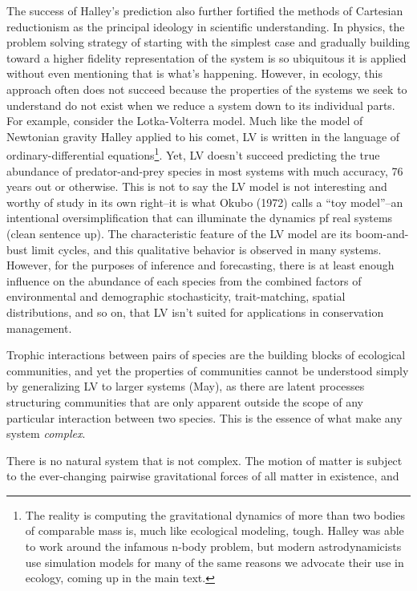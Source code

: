 The success of Halley's prediction also further fortified the methods of
Cartesian reductionism as the principal ideology in scientific
understanding. In physics, the problem solving strategy of starting with
the simplest case and gradually building toward a higher fidelity
representation of the system is so ubiquitous it is applied without even
mentioning that is what's happening. However, in ecology, this approach
often does not succeed because the properties of the systems we seek to
understand do not exist when we reduce a system down to its individual
parts. For example, consider the Lotka-Volterra model. Much like the
model of Newtonian gravity Halley applied to his comet, LV is written in
the language of ordinary-differential equations\footnote{The reality is
  computing the gravitational dynamics of more than two bodies of
  comparable mass is, much like ecological modeling, tough. Halley was
  able to work around the infamous n-body problem, but modern
  astrodynamicists use simulation models for many of the same reasons we
  advocate their use in ecology, coming up in the main text.}. Yet, LV
doesn't succeed predicting the true abundance of predator-and-prey
species in most systems with much accuracy, 76 years out or otherwise.
This is not to say the LV model is not interesting and worthy of study
in its own right--it is what Okubo (1972) calls a ``toy model''--an
intentional oversimplification that can illuminate the dynamics pf real
systems (clean sentence up). The characteristic feature of the LV model
are its boom-and-bust limit cycles, and this qualitative behavior is
observed in many systems. However, for the purposes of inference and
forecasting, there is at least enough influence on the abundance of each
species from the combined factors of environmental and demographic
stochasticity, trait-matching, spatial distributions, and so on, that LV
isn't suited for applications in conservation management.

Trophic interactions between pairs of species are the building blocks of
ecological communities, and yet the properties of communities cannot be
understood simply by generalizing LV to larger systems (May), as there
are latent processes structuring communities that are only apparent
outside the scope of any particular interaction between two species.
This is the essence of what make any system \emph{complex}.

There is no natural system that is not complex. The motion of matter is
subject to the ever-changing pairwise gravitational forces of all matter
in existence, and

